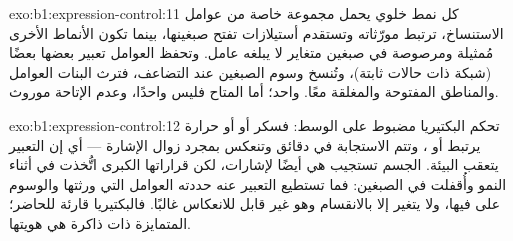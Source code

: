 \begin{solution}{exo:b1:expression-control:11}
كل نمط خلوي يحمل مجموعة خاصة من عوامل الاستنساخ، ترتبط 
مورّثاته وتستقدم أستيلازات تفتح صبغينها، بينما تكون 
الأنماط الأخرى مُمثيلة ومرصوصة في صبغين متغاير لا يبلغه عامل. وتحفظ
العوامل تعبير بعضها بعضًا (شبكة ذات حالات ثابتة)، وتُنسخ وسوم
الصبغين عند التضاعف، فترث البنات العوامل والمناطق المفتوحة
والمغلقة معًا.  واحد؛ أما  المتاح فليس واحدًا،
وعدم الإتاحة موروث.
\end{solution}

\begin{solution}{exo:b1:expression-control:12}
تحكم البكتيريا مضبوط على الوسط: فسكر أو  أو حرارة يرتبط
 أو ، وتتم الاستجابة في دقائق وتنعكس بمجرد زوال
الإشارة --- أي إن التعبير يتعقب البيئة.  الجسم تستجيب هي أيضًا
لإشارات، لكن قراراتها الكبرى اتُّخذت في أثناء النمو وأُقفلت في
الصبغين: فما تستطيع التعبير عنه حددته العوامل التي ورثتها والوسوم
على  فيها، ولا يتغير إلا بالانقسام وهو غير قابل للانعكاس غالبًا.
فالبكتيريا قارئة للحاضر؛  المتمايزة ذات ذاكرة هي هويتها.
\end{solution}

